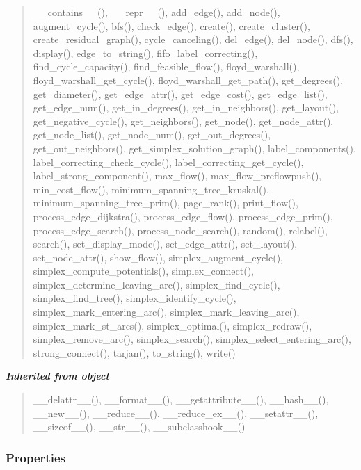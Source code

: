 \begin{quote}
\_\_contains\_\_(), \_\_repr\_\_(), add\_edge(), add\_node(), augment\_cycle(), bfs(), check\_edge(), create(), create\_cluster(), create\_residual\_graph(), cycle\_canceling(), del\_edge(), del\_node(), dfs(), display(), edge\_to\_string(), fifo\_label\_correcting(), find\_cycle\_capacity(), find\_feasible\_flow(), floyd\_warshall(), floyd\_warshall\_get\_cycle(), floyd\_warshall\_get\_path(), get\_degrees(), get\_diameter(), get\_edge\_attr(), get\_edge\_cost(), get\_edge\_list(), get\_edge\_num(), get\_in\_degrees(), get\_in\_neighbors(), get\_layout(), get\_negative\_cycle(), get\_neighbors(), get\_node(), get\_node\_attr(), get\_node\_list(), get\_node\_num(), get\_out\_degrees(), get\_out\_neighbors(), get\_simplex\_solution\_graph(), label\_components(), label\_correcting\_check\_cycle(), label\_correcting\_get\_cycle(), label\_strong\_component(), max\_flow(), max\_flow\_preflowpush(), min\_cost\_flow(), minimum\_spanning\_tree\_kruskal(), minimum\_spanning\_tree\_prim(), page\_rank(), print\_flow(), process\_edge\_dijkstra(), process\_edge\_flow(), process\_edge\_prim(), process\_edge\_search(), process\_node\_search(), random(), relabel(), search(), set\_display\_mode(), set\_edge\_attr(), set\_layout(), set\_node\_attr(), show\_flow(), simplex\_augment\_cycle(), simplex\_compute\_potentials(), simplex\_connect(), simplex\_determine\_leaving\_arc(), simplex\_find\_cycle(), simplex\_find\_tree(), simplex\_identify\_cycle(), simplex\_mark\_entering\_arc(), simplex\_mark\_leaving\_arc(), simplex\_mark\_st\_arcs(), simplex\_optimal(), simplex\_redraw(), simplex\_remove\_arc(), simplex\_search(), simplex\_select\_entering\_arc(), strong\_connect(), tarjan(), to\_string(), write()
\end{quote}

\large{\textbf{\textit{Inherited from object}}}

\begin{quote}
\_\_delattr\_\_(), \_\_format\_\_(), \_\_getattribute\_\_(), \_\_hash\_\_(), \_\_new\_\_(), \_\_reduce\_\_(), \_\_reduce\_ex\_\_(), \_\_setattr\_\_(), \_\_sizeof\_\_(), \_\_str\_\_(), \_\_subclasshook\_\_()
\end{quote}


  \subsubsection{Properties}

